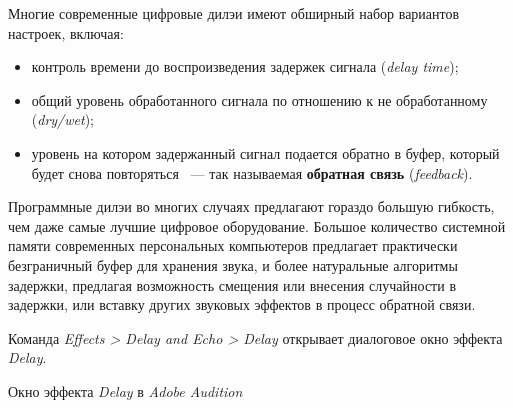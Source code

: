 \documentclass{beamer}
\begin{document}
\begin{frame}
  Многие современные цифровые дилэи имеют обширный набор вариантов настроек, включая:
  \begin{itemize}
    \item контроль времени до воспроизведения задержек сигнала (\emph{delay time});
    \item общий уровень обработанного сигнала по отношению к не обработанному (\emph{dry/wet});
    \item уровень на котором задержанный сигнал подается обратно в буфер, который будет снова повторяться ~--- так называемая \textbf{обратная связь} (\emph{feedback}).
  \end{itemize}  
  
  Программные дилэи во многих случаях предлагают гораздо большую гибкость, чем даже самые лучшие цифровое оборудование. Большое количество системной памяти современных персональных компьютеров предлагает практически безграничный буфер для хранения звука, и более натуральные алгоритмы задержки, предлагая возможность смещения или внесения случайности в задержки, или вставку других звуковых эффектов в процесс обратной связи.
\end{frame}

\begin{frame}
  Команда \emph{Effects > Delay and Echo > Delay} открывает диалоговое окно эффекта \emph{Delay}.
  
  \begin{block}{Окно эффекта \emph{Delay} в \emph{Adobe Audition}}
  \end{block}
\end{frame}
\end{document}

